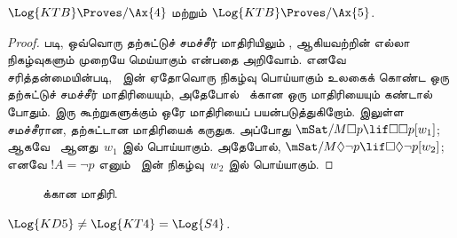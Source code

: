 \documentclass[../../../include/open-logic-section]{subfiles}
\begin{document}
\begin{thm}
  $\Log{KTB} \Proves/ \Ax{4}$ மற்றும் $\Log{KTB} \Proves/ \Ax{5}$.
\end{thm}

\begin{proof}
   படி, ஒவ்வொரு தற்சுட்டுச் சமச்சீர்
  மாதிரியிலும் ,  ஆகியவற்றின் எல்லா நிகழ்வுகளும் முறையே
  மெய்யாகும் என்பதை அறிவோம். எனவே சரித்தன்மையின்படி,~ இன் ஏதோவொரு
  நிகழ்வு பொய்யாகும் உலகைக் கொண்ட ஒரு தற்சுட்டுச் சமச்சீர் மாதிரியையும்,
  அதேபோல்~ க்கான ஒரு மாதிரியையும் கண்டால் போதும். இரு கூற்றுகளுக்கும்
  ஒரே மாதிரியைப் பயன்படுத்துகிறோம்.  இலுள்ள சமச்சீரான,
  தற்சுட்டான மாதிரியைக் கருதுக. அப்போது
  $\mSat/{M}{\Box p \lif \Box \Box p}[w_1]$; ஆகவே~ ஆனது~$w_1$
  இல் பொய்யாகும். அதேபோல், $\mSat/{M}{\Diamond
    \lnot p \lif \Box \Diamond \lnot p}[w_2]$; எனவே $!A = \lnot p$
  எனும்~ இன் நிகழ்வு~$w_2$ இல் பொய்யாகும்.
\end{proof}

\begin{figure}[htpb]
  \centering
  \caption{ க்கான மாதிரி.}
\end{figure}

\begin{thm}
  $\Log{KD5} \neq \Log{KT4} = \Log{S4}$.
\end{thm}
\end{document}
